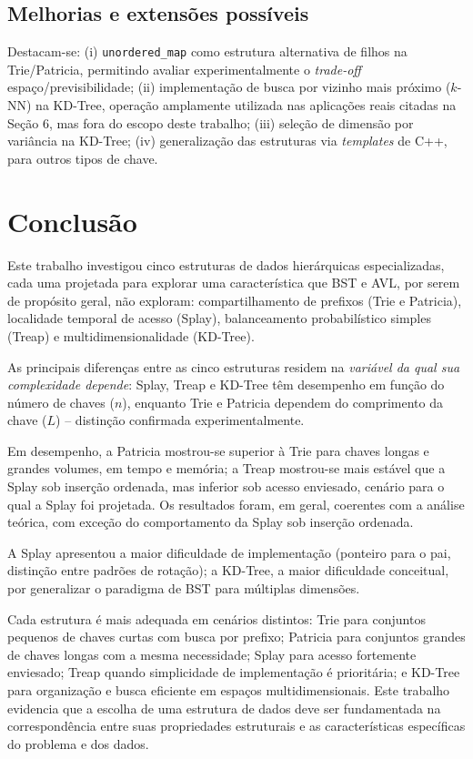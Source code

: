\documentclass[11pt]{article}
\begin{document}
\subsection{Melhorias e extensões possíveis}

Destacam-se: (i) \texttt{unordered\_map} como estrutura alternativa de filhos
na Trie/Patricia, permitindo avaliar experimentalmente o \emph{trade-off}
espaço/previsibilidade; (ii) implementação de busca por vizinho mais próximo
($k$-NN) na KD-Tree, operação amplamente utilizada nas aplicações reais
citadas na Seção 6, mas fora do escopo deste trabalho; (iii)
seleção de dimensão por variância na KD-Tree; (iv) generalização das
estruturas via \textit{templates} de C++, para outros tipos de chave.

\section{Conclusão}

Este trabalho investigou cinco estruturas de dados hierárquicas
especializadas, cada uma projetada para explorar uma característica que BST e
AVL, por serem de propósito geral, não exploram: compartilhamento de
prefixos (Trie e Patricia), localidade temporal de acesso (Splay),
balanceamento probabilístico simples (Treap) e multidimensionalidade
(KD-Tree).

As principais diferenças entre as cinco estruturas residem na \emph{variável
da qual sua complexidade depende}: Splay, Treap e KD-Tree têm desempenho em
função do número de chaves ($n$), enquanto Trie e Patricia dependem do
comprimento da chave ($L$) -- distinção confirmada experimentalmente.

Em desempenho, a Patricia mostrou-se superior à Trie para chaves longas e
grandes volumes, em tempo e memória; a Treap mostrou-se mais estável que a
Splay sob inserção ordenada, mas inferior sob acesso enviesado, cenário para
o qual a Splay foi projetada. Os resultados foram, em geral, coerentes com a
análise teórica, com exceção do comportamento da Splay sob inserção ordenada.

A Splay apresentou a maior dificuldade de implementação (ponteiro para o pai,
distinção entre padrões de rotação); a KD-Tree, a maior dificuldade
conceitual, por generalizar o paradigma de BST para múltiplas dimensões.

Cada estrutura é mais adequada em cenários distintos: Trie para conjuntos
pequenos de chaves curtas com busca por prefixo; Patricia para conjuntos
grandes de chaves longas com a mesma necessidade; Splay para acesso
fortemente enviesado; Treap quando simplicidade de implementação é
prioritária; e KD-Tree para organização e busca eficiente em espaços
multidimensionais. Este trabalho evidencia que a escolha de uma estrutura de
dados deve ser fundamentada na correspondência entre suas propriedades
estruturais e as características específicas do problema e dos dados.
\end{document}
